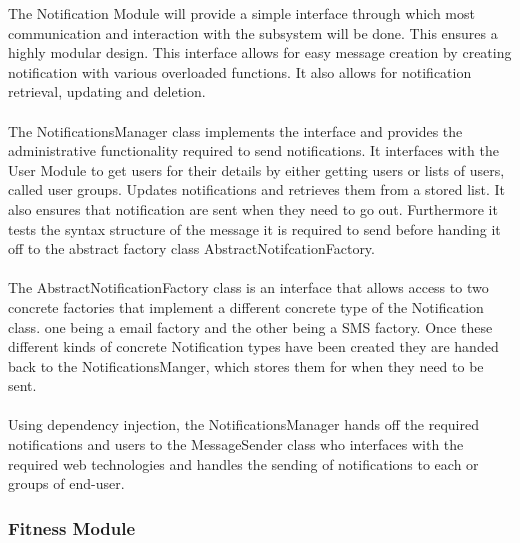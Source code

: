 \documentclass{article}
\begin{document}
			{The Notification Module will provide a simple interface through which most communication and interaction with the subsystem will be done. This ensures a highly modular design. This interface allows for easy message creation by creating notification with various overloaded functions. It also allows for notification retrieval, updating and deletion.\\ \\The NotificationsManager class implements the interface and provides the administrative functionality required to send notifications. It interfaces with the User Module to get users for their details by either getting users or lists of users, called user groups. Updates notifications and retrieves them from a stored list. It also ensures that notification are sent when they need to go out. Furthermore it tests the syntax structure of the message it is required to send before handing it off to the abstract factory class AbstractNotifcationFactory.\\ \\The AbstractNotificationFactory class is an interface that allows access to two concrete factories that implement a different concrete type of the Notification class. one being a email factory and the other being a SMS factory. Once these different kinds of concrete Notification types have been created they are handed back to the NotificationsManger, which stores them for when they need to be sent.\\\\Using dependency injection, the NotificationsManager hands off the required notifications and users to the MessageSender class who interfaces with the required web technologies and handles the sending of notifications to each  or groups of end-user.}
		\subsubsection{Fitness Module}
\end{document}

